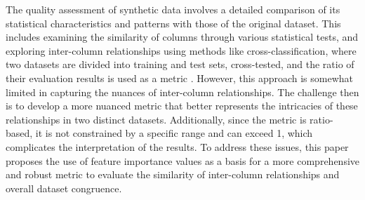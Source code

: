 The quality assessment of synthetic data involves a detailed comparison of its statistical characteristics and patterns with those of the original dataset. This includes examining the similarity of columns through various statistical tests, and exploring inter-column relationships using methods like cross-classification, where two datasets are divided into training and test sets, cross-tested, and the ratio of their evaluation results is used as a metric \cite{mullerEvaluationSyntheticElectronic2022, goncalvesGenerationEvaluationSynthetic2020a}. However, this approach is somewhat limited in capturing the nuances of inter-column relationships. The challenge then is to develop a more nuanced metric that better represents the intricacies of these relationships in two distinct datasets. Additionally, since the metric is ratio-based, it is not constrained by a specific range and can exceed 1, which complicates the interpretation of the results. To address these issues, this paper proposes the use of feature importance values as a basis for a more comprehensive and robust metric to evaluate the similarity of inter-column relationships and overall dataset congruence.
